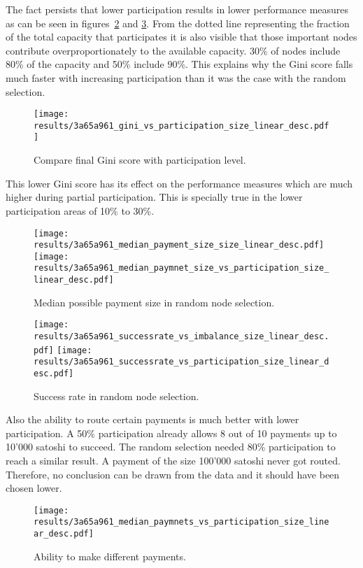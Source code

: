 \documentclass[final]{fhnwreport}       %
\begin{document}
The fact persists that lower participation results in lower performance measures as can be seen in figures~\ref{fig:pay_size_size_linear_desc} and \ref{fig:success_size_linear_desc}. From the dotted line representing the fraction of the total capacity that participates it is also visible that those important nodes contribute overproportionately to the available capacity. 30\% of nodes include 80\% of the capacity and 50\% include 90\%. This explains why the Gini score falls much faster with increasing participation than it was the case with the random selection.

\begin{figure}[H]
\centering
\texttt{[image: results/3a65a961\_gini\_vs\_participation\_size\_linear\_desc.pdf]}
\caption{Compare final Gini score with participation level.}
\label{fig:gini_part_size_linear_desc}
\end{figure}

This lower Gini score has its effect on the performance measures which are much higher during partial participation. This is specially true in the lower participation areas of 10\% to 30\%.  

\begin{figure}[htp]
\centering
\texttt{[image: results/3a65a961\_median\_payment\_size\_size\_linear\_desc.pdf]}\hfill
\texttt{[image: results/3a65a961\_median\_paymnet\_size\_vs\_participation\_size\_linear\_desc.pdf]}
\caption{Median possible payment size in random node selection.}
\label{fig:pay_size_size_linear_desc}
\end{figure}


\begin{figure}[htp]
\centering
\texttt{[image: results/3a65a961\_successrate\_vs\_imbalance\_size\_linear\_desc.pdf]}\hfill
\texttt{[image: results/3a65a961\_successrate\_vs\_participation\_size\_linear\_desc.pdf]}
\caption{Success rate in random node selection.}
\label{fig:success_size_linear_desc}
\end{figure}

Also the ability to route certain payments is much better with lower participation. A 50\% participation already allows 8 out of 10 payments up to 10'000 satoshi to succeed. The random selection needed 80\% participation to reach a similar result. A payment of the size 100'000 satoshi never got routed. Therefore, no conclusion can be drawn from the data and it should have been chosen lower.

\begin{figure}[htp]
\centering
\texttt{[image: results/3a65a961\_median\_paymnets\_vs\_participation\_size\_linear\_desc.pdf]}
\caption{Ability to make different payments.}
\label{fig:sizes_size_linear_desc}
\end{figure}
\end{document}
